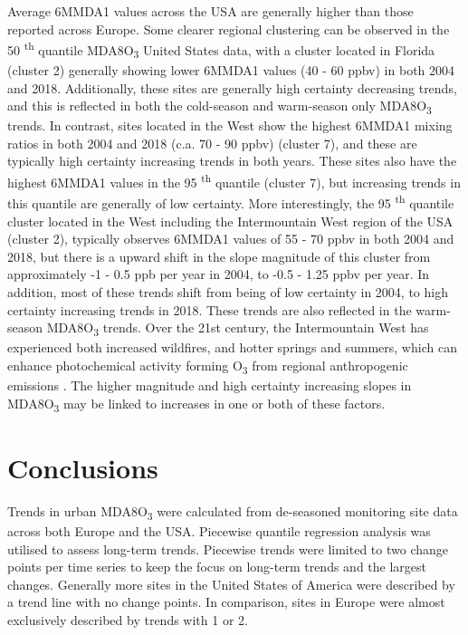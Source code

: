 \documentclass[journal abbreviation, manuscript]{copernicus}
\begin{document}
Average 6MMDA1 values across the USA are generally higher than those reported across Europe. Some clearer regional clustering can be observed in the 50 \textsuperscript{th} quantile MDA8O\textsubscript{3} United States data, with a cluster located in Florida (cluster 2) generally showing lower 6MMDA1 values (40 - 60 ppbv) in both 2004 and 2018. Additionally, these sites are generally high certainty decreasing trends, and this is reflected in both the cold-season and warm-season only MDA8O\textsubscript{3} trends. In contrast, sites located in the West show the highest 6MMDA1 mixing ratios in both 2004 and 2018 (c.a. 70 - 90 ppbv) (cluster 7), and these are typically high certainty increasing trends in both years. These sites also have the highest 6MMDA1 values in the 95 \textsuperscript{th} quantile (cluster 7), but increasing trends in this quantile are generally of low certainty. More interestingly, the 95 \textsuperscript{th} quantile cluster located in the West including the Intermountain West region of the USA (cluster 2), typically observes 6MMDA1 values of 55 - 70 ppbv in both 2004 and 2018, but there is a upward shift in the slope magnitude of this cluster from approximately -1 - 0.5 ppb per year in 2004, to -0.5 - 1.25 ppbv per year. In addition, most of these trends shift from being of low certainty in 2004, to high certainty increasing trends in 2018. These trends are also reflected in the warm-season MDA8O\textsubscript{3} trends. Over the 21st century, the Intermountain West has experienced both increased wildfires, and hotter springs and summers, which can enhance photochemical activity forming O\textsubscript{3} from regional anthropogenic emissions \citep{Lin2017, Li2021, Peterson2021, Iglesias2022}. The higher magnitude and high certainty increasing slopes in MDA8O\textsubscript{3} may be linked to increases in one or both of these factors.

\section{Conclusions}  %

Trends in urban MDA8O\textsubscript{3} were calculated from de-seasoned monitoring site data across both Europe and the USA. Piecewise quantile regression analysis was utilised to assess long-term trends. Piecewise trends were limited to two change points per time series to keep the focus on long-term trends and the largest changes. Generally more sites in the United States of America were described by a trend line with no change points. In comparison, sites in Europe were almost exclusively described by trends with 1 or 2. 
\end{document}
